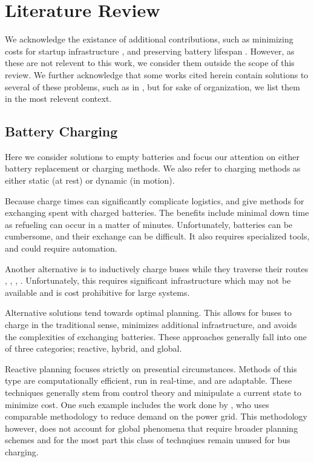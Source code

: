 \section{Literature Review}
\par We acknowledge the existance of additional contributions, such as minimizing costs for startup infrastructure \cite{wei_optimizing_2018}, and preserving battery lifespan \cite{houbbadi_optimal_2019}. However, as these are not relevent to this work, we consider them outside the scope of this review.  We further acknowledge that some works cited herein contain solutions to several of these problems, such as in \cite{zhou_optimization_2018}, but for sake of organization, we list them in the most relevent context. 
\subsection{Battery Charging}
Here we consider solutions to empty batteries and focus our attention on either battery replacement or charging methods. We also refer to charging methods as either static (at rest) or dynamic (in motion).
\par Because charge times can significantly complicate logistics, \cite{xian_zhang_optimal_2016} and \cite{jain_battery_2020} give methods for exchanging spent with charged batteries.  The benefits include minimal down time as refueling can occur in a matter of minutes.  Unfortunately, batteries can be cumbersome, and their exchange can be difficult.  It also requires specialized tools, and could require automation.  
\par Another alternative is to inductively charge buses while they traverse their routes \cite{balde_electric_2019}, \cite{jain_battery_2020}, \cite{jeong_automatic_2018}, \cite{csonka_optimization_2021}.  Unfortunately, this requires significant infrastructure which may not be available and is cost prohibitive for large systems. 
\par Alternative solutions tend towards optimal planning.  This allows for buses to charge in the traditional sense, minimizes additional infrastructure, and avoids the complexities of exchanging batteries.  These approaches generally fall into one of three categories; reactive, hybrid, and global.  
\par Reactive planning focuses strictly on presential circumstances.  Methods of this type are computationally efficient, run in real-time, and are adaptable. These techniques generally stem from control theory and minipulate a current state to minimize cost.  One such example includes the work done by \cite{cheng_smart_2020}, who uses comparable methodology to reduce demand on the power grid.  This methodology however, does not account for global phenomena that require broader planning schemes and for the most part this class of technqiues remain unused for bus charging.
